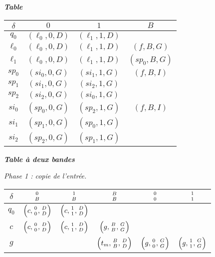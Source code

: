 \begin{center}
	\emph{\bfseries Table }
	
	\smallskip
	\begin{tabular}{|c||c|c|c|}
		\hline
		$\delta$ 
			& $0$ 
			& $1$
			& $B$ \\
		\hline
		\hline
		$q_0$ 
			& $(\ell_0 , 0, D)$ 
			& $(\ell_1 , 1, D)$
			&  \\
		\hline
		$\ell_0$
			& $(\ell_0 , 0 , D)$
			& $(\ell_1 , 1 , D)$
			& $(f      , B , G)$ \\
		\hline
		$\ell_1$
			& $(\ell_0 , 0 , D)$
			& $(\ell_1 , 1 , D)$
			& $(sp_0   , B , G)$ \\
		\hline
		\hline
		$sp_0$ 
			& $(si_0 , 0, G)$ 
			& $(si_1 , 1, G)$
			& $(f    , B, I)$ \\
		\hline
		$sp_1$ 
			& $(si_1 , 0, G)$ 
			& $(si_2 , 1, G)$
			&                 \\
		\hline
		$sp_2$ 
			& $(si_2 , 0, G)$ 
			& $(si_0 , 1, G)$
			&                 \\
		\hline
		\hline
		$si_0$ 
			& $(sp_0 , 0, G)$ 
			& $(sp_2 , 1, G)$
			& $(f    , B, I)$ \\
		\hline
		$si_1$ 
			& $(sp_1 , 0, G)$ 
			& $(sp_0 , 1, G)$
			&                 \\
		\hline
		$si_2$ 
			& $(sp_2 , 0, G)$ 
			& $(sp_1 , 1, G)$
			&                 \\
		\hline
	\end{tabular}
\end{center}




\begin{center}
	\emph{\bfseries Table à deux bandes}
	
	\smallskip
	\emph{\small Phase 1 : copie de l'entrée.}
	
	\smallskip
	\renewcommand{\arraystretch}{1.25}
	\begin{tabular}{|c||c|c|c|c|c|}
		\hline
		$\delta$ 
			& $\twocoord{0}{B}$ 
			& $\twocoord{1}{B}$ 
			& $\twocoord{B}{B}$ 
			& $\twocoord{0}{0}$ 
			& $\twocoord{1}{1}$ \\
		\hline
		\hline
		$q_0$ 
			& $\left( c, \twocoord{0}{0}, \twocoord{D}{D} \right)$ 
			& $\left( c, \twocoord{1}{1}, \twocoord{D}{D} \right)$
			&                   
			&                   
			&                                                      \\
		\hline
		$c$ 
			& $\left( c, \twocoord{0}{0}, \twocoord{D}{D} \right)$ 
			& $\left( c, \twocoord{1}{1}, \twocoord{D}{D} \right)$
			& $\left( g, \twocoord{B}{B}, \twocoord{G}{G} \right)$
			&                   
			&                                                      \\
		\hline
		$g$ 
			&                     
			&                   
			& $\left( t_m, \twocoord{B}{B}, \twocoord{D}{D} \right)$
			& $\left( g  , \twocoord{0}{0}, \twocoord{G}{G} \right)$ 
			& $\left( g  , \twocoord{1}{1}, \twocoord{G}{G} \right)$ \\
		\hline
	\end{tabular}
	\renewcommand{\arraystretch}{1}
\end{center}



